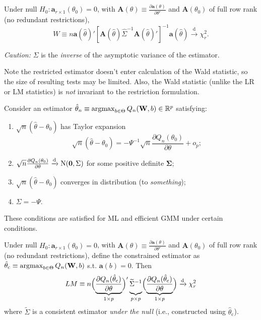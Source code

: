 \documentclass[8pt,letterpaper, landscape]{extarticle} %
\newcommand{\mA}{\ensuremath{\mathbf{A}}}
\newcommand{\mSigma}{\ensuremath{\mathbf{\Sigma}}}
\newcommand{\mzero}{\ensuremath{\mathbf{0}}}
\begin{document}
\begin{multicols}{3}
\begin{description}
Under null $ H_0 \colon \mathbf{a}_{r \times 1} (\theta_0) = 0 $, with $ \mA (\theta) \equiv \frac{\partial \mathbf{a} (\theta)}{\partial \theta'} $ and $ \mA (\theta_0) $ of full row rank (no redundant restrictions),
\[ W \equiv n \mathbf{a} (\hat{\theta})' [ \mA (\hat{\theta}) \widehat{\Sigma}^{-1} \mA (\hat{\theta})' ]^{-1} \mathbf{a} (\hat{\theta}) \xrightarrow{\text{d}} \chi^{2}_{r}. \]

\textit{Caution:} $ \Sigma $ is the \textit{inverse} of the asymptotic variance of the estimator.

Note the restricted estimator doesn't enter calculation of the Wald statistic, so the size of resulting tests may be limited. Also, the Wald statistic (unlike the LR or LM statistics) is \textit{not} invariant to the restriction formulation.

 Consider an estimator $ \hat{\theta}_n \equiv \operatorname*{argmax}_{b \in \Theta} Q_n (\mathbf{W} , b) \in \mathbb{R}^p $ satisfying:
\begin{enumerate}
\item $ \sqrt{n} (\hat{\theta} - \theta_0) $ has Taylor expansion
\[ \sqrt{n} (\hat{\theta} - \theta_0) = - \Psi^{-1} \sqrt{n} \frac{\partial Q_n (\theta_0)}{\partial \theta} + o_p ; \]
\item $ \sqrt{n} \tfrac{\partial Q_n (\theta_0)}{\partial \theta} \xrightarrow{\text{d}} \n (\mzero , \Sigma ) $ for some positive definite $ \mSigma $;
\item $ \sqrt{n} (\hat{\theta} - \theta_0) $ converges in distribution (to \textit{something});
\item $ \Sigma = - \Psi $.
\end{enumerate}
These conditions are satisfied for ML and efficient GMM under certain conditions.

Under null $ H_0 \colon \mathbf{a}_{r \times 1} (\theta_0) = 0 $, with $ \mA (\theta) \equiv \frac{\partial \mathbf{a} (\theta)}{\partial \theta'} $ and $ \mA (\theta_0) $ of full row rank (no redundant restrictions), define the constrained estimator as $ \hat{\theta}_\text{c} \equiv \operatorname*{argmax}_{b \in \Theta} Q_n (\mathbf{W} , b) $ s.t. $ \mathbf{a} (b) = 0 $. Then
\[ LM \equiv n \Bigl ( \underbrace{\frac{\partial Q_n (\hat{\theta}_\text{c}) }{\partial \theta}}_{1 \times p} \Bigr )' \underbrace{
\vphantom{\frac{\partial Q_n (\hat{\theta}_\text{c}) }{\partial \theta}}
\widetilde{\Sigma}^{-1}}_{p \times p} \Bigl ( \underbrace{\frac{\partial Q_n (\hat{\theta}_\text{c}) }{\partial \theta}}_{1 \times p} \Bigr ) \xrightarrow{\text{d}} \chi^{2}_{r} \]
where $ \widetilde{\Sigma} $ is a consistent estimator \textit{under the null} (i.e., constructed using $ \hat{\theta}_\text{c} $).


\end{description}
\end{multicols}
\end{document}
